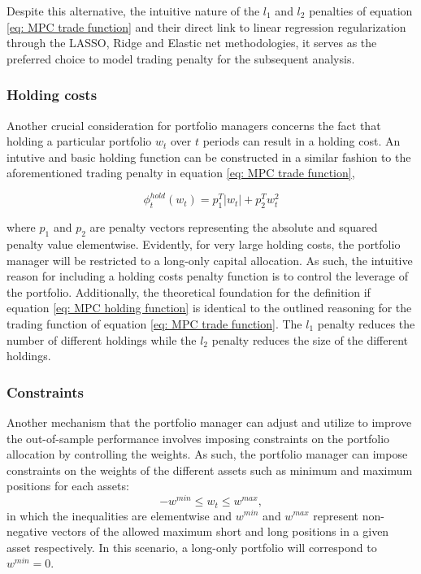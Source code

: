 Despite this alternative, the intuitive nature of the $l_1$ and $l_2$ penalties of equation \ref{eq: MPC trade function} and their direct link to linear regression regularization through the LASSO, Ridge and Elastic net methodologies, it serves as the preferred choice to model trading penalty for the subsequent analysis.

\subsubsection{Holding costs}
Another crucial consideration for portfolio managers concerns the fact that holding a particular portfolio $w_t$ over $t$ periods can result in a holding cost. An intutive and basic holding function can be constructed in a similar fashion to the aforementioned trading penalty in equation \ref{eq: MPC trade function},

\begin{equation}
    \phi_t^{hold}(w_t) = p_1^T|w_t| + p_2^Tw_t^2
    \label{eq: MPC holding function}
\end{equation}

where $p_1$ and $p_2$ are penalty vectors representing the absolute and squared penalty value elementwise. Evidently, for very large holding costs, the portfolio manager will be restricted to a long-only capital allocation. As such, the intuitive reason for including a holding costs penalty function is to control the leverage of the portfolio. Additionally, the theoretical foundation for the definition if equation \ref{eq: MPC holding function} is identical to the outlined reasoning for the trading function of equation \ref{eq: MPC trade function}. The $l_1$ penalty reduces the number of different holdings while the $l_2$ penalty reduces the size of the different holdings.

\subsubsection{Constraints}
Another mechanism that the portfolio manager can adjust and utilize to improve the out-of-sample performance involves imposing constraints on the portfolio allocation by controlling the weights. As such, the portfolio manager can impose constraints on the weights of the different assets such as minimum and maximum positions for each assets:
\begin{equation}
    -w^{min}\leq w_t\leq w^{max},
\end{equation}
in which the inequalities are elementwise and $w^{min}$ and $w^{max}$ represent non-negative vectors of the allowed maximum short and long positions in a given asset respectively. In this scenario, a long-only portfolio will correspond to $w^{min}=0$.

